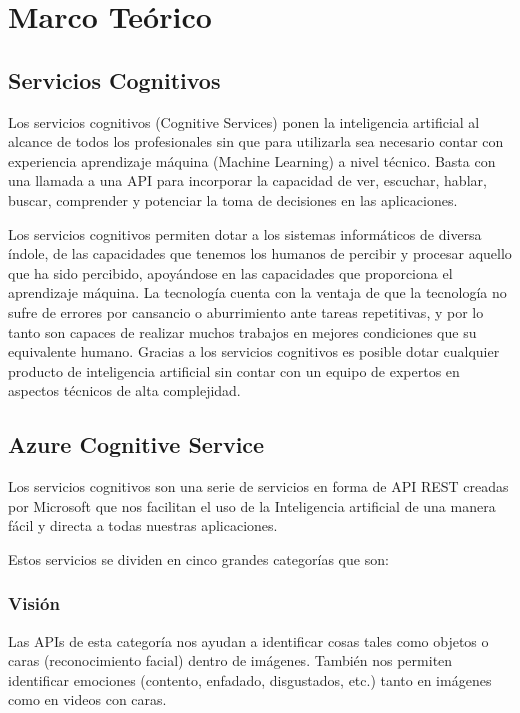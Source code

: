 \section{Marco Teórico}

\subsection{Servicios Cognitivos}

Los servicios cognitivos (Cognitive Services) ponen la inteligencia artificial al alcance de todos los profesionales sin que para utilizarla sea necesario contar con experiencia aprendizaje máquina (Machine Learning) a nivel técnico. Basta con una llamada a una API para incorporar la capacidad de ver, escuchar, hablar, buscar, comprender y potenciar la toma de decisiones en las aplicaciones.

Los servicios cognitivos permiten dotar a los sistemas informáticos de diversa índole, de las capacidades que tenemos los humanos de percibir y procesar aquello que ha sido percibido, apoyándose en las capacidades que proporciona el aprendizaje máquina. La tecnología cuenta con la ventaja de que la tecnología no sufre de errores por cansancio o aburrimiento ante tareas repetitivas, y por lo tanto son capaces de realizar muchos trabajos en mejores condiciones que su equivalente humano. Gracias a los servicios cognitivos es posible dotar cualquier producto de inteligencia artificial sin contar con un equipo de expertos en aspectos técnicos de alta complejidad.

\subsection{Azure Cognitive Service}

Los servicios cognitivos son una serie de servicios en forma de API REST creadas por Microsoft que nos facilitan el uso de la Inteligencia artificial de una manera fácil y directa a todas nuestras aplicaciones. %

Estos servicios se dividen en cinco grandes categorías que son:

\subsubsection{Visión} Las APIs de esta categoría nos ayudan a identificar cosas tales como objetos o caras (reconocimiento facial) dentro de imágenes. También nos permiten identificar emociones (contento, enfadado, disgustados, etc.) tanto en imágenes como en videos con caras.

